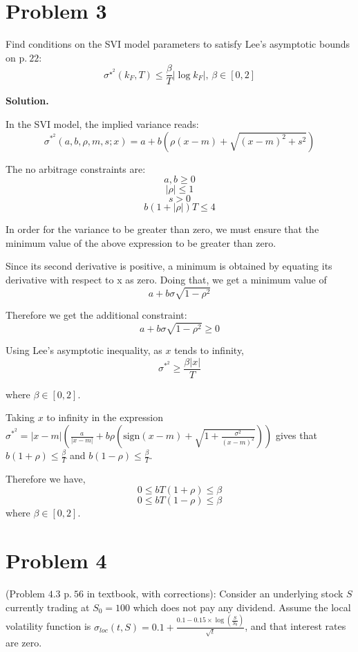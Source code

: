 \documentclass[12pt]{article}
\newenvironment{solution}{\vspace{0.2cm} \textbf{Solution.}}{}
\begin{document}
\section*{Problem 3}
Find conditions on the SVI model parameters to satisfy Lee’s asymptotic bounds on p$.\ 22$: 
$$\sigma^{\star^2} (k_F,T) \leq \frac{\beta}{T} |\log{k_F}|,\, \beta \in [0,2]$$

	\begin{solution}

	In the SVI model, the implied variance reads:
	$$ \sigma^{*^2}(a,b,\rho,m,s; x) = a + b(\rho(x-m) + \sqrt{(x-m)^2 + s^2})$$
	
	The no arbitrage constraints are: 
	$$ a,b \geq 0$$
	$$ |\rho| \leq 1 $$
	$$ s > 0 $$
	$$ b(1 + |\rho|)T \leq 4$$
	
	In order for the variance to be greater than zero, we must ensure that the minimum value of the above expression to be greater than zero.
	
	Since its second derivative is positive, a minimum is obtained by equating its derivative with respect to x as zero. Doing that, we get a minimum value of $$a + b\sigma\sqrt{1-\rho^2}$$
	
	Therefore we get the additional constraint: $$a + b\sigma\sqrt{1-\rho^2} \geq 0$$
	
	Using Lee's asymptotic inequality, as $x$ tends to infinity,
	$$ \sigma^{*^2} \geq \frac{\beta|x|}{T}$$
	
	where $\beta \in [0,2]$.
	
	Taking $x$ to infinity in the expression $\sigma^{*^2} = |x-m|\left(\frac{a}{|x-m|} + b\rho \left(\text{sign}(x-m) + \sqrt{1 + \frac{\sigma^2}{(x-m)^2}} \right)\right)$
	gives that $b(1+\rho) \leq \frac{\beta}{T}$ and $b(1-\rho) \leq \frac{\beta}{T}$.
	
	Therefore we have, $$0 \leq bT(1+\rho) \leq \beta$$ $$0 \leq bT(1-\rho) \leq \beta$$ where $\beta \in [0,2]$.

	\end{solution}

\newpage

\section*{Problem 4}
(Problem $4.3$ p$.\ 56$ in textbook, with corrections): Consider an underlying stock $S$ currently trading at $S_0 = 100$ which does not pay any dividend. Assume the local volatility function is $\sigma_{loc} (t, S) = 0.1 + \frac{0.1 - 0.15 \times \log\left(\frac{S}{S_0}\right)}{\sqrt{t}}$, and that interest rates are zero.
\end{document}
